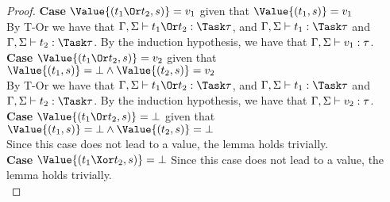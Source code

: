 \begin{proof}
  \noindent\textbf{Case} $\Value{(t_1\Or t_2,s)}=v_1$ given that $\Value{(t_1,s)}=v_1$\\ By T-Or we have that $\Gamma,\Sigma\infers t_1\Or t_2:\Task\tau$, and $\Gamma,\Sigma\infers t_1:\Task\tau$ and $\Gamma,\Sigma\infers t_2:\Task\tau$. By the induction hypothesis, we have that $\Gamma,\Sigma\vdash v_1:\tau$.\\

  \noindent\textbf{Case} $\Value{(t_1\Or t_2,s)}=v_2$ given that $\Value{(t_1,s)}=\bot\wedge\Value{(t_2,s)}=v_2$\\ By T-Or we have that $\Gamma,\Sigma\infers t_1\Or t_2:\Task\tau$, and $\Gamma,\Sigma\infers t_1:\Task\tau$ and $\Gamma,\Sigma\infers t_2:\Task\tau$. By the induction hypothesis, we have that $\Gamma,\Sigma\vdash v_2:\tau$.\\

  \noindent\textbf{Case} $\Value{(t_1\Or t_2,s)}=\bot$ given that $\Value{(t_1,s)}=\bot\wedge\Value{(t_2,s)}=\bot$\\ Since this case does not lead to a value, the lemma holds trivially.\\

  \noindent\textbf{Case} $\Value{(t_1\Xor t_2,s)}=\bot$ Since this case does not lead to a value, the lemma holds trivially.\\
\end{proof}



